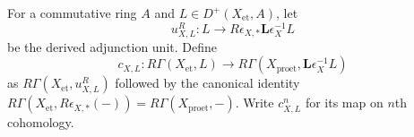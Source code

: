 
\begin{definition}
\label{def:weil-efi-site-derived-cohomology-comparison}
For a commutative ring $A$ and $L\in D^+(X_{\mathrm{et}},A)$, let
\[
 u^R_{X,L}:L\longrightarrow
 R\epsilon_{X,*}\mathbf L\epsilon_X^{-1}L
\]
be the derived adjunction unit.  Define
\[
 c_{X,L}:R\Gamma(X_{\mathrm{et}},L)
 \longrightarrow
 R\Gamma(X_{\mathrm{proet}},\mathbf L\epsilon_X^{-1}L)
\]
as $R\Gamma(X_{\mathrm{et}},u^R_{X,L})$ followed by the canonical identity
$R\Gamma(X_{\mathrm{et}},R\epsilon_{X,*}(-))
=R\Gamma(X_{\mathrm{proet}},-)$.  Write $c^n_{X,L}$ for its map on
$n$th cohomology.
\end{definition}

